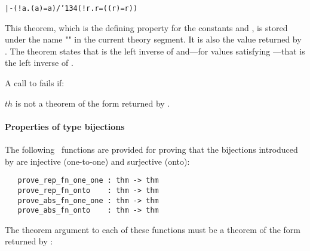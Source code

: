 {\def\bk{\char'134}
\begin{hol}\begin{alltt}
   |- (!a. ( a) = a) /\bk (!r.  r = (( r) = r))
\end{alltt}\end{hol}}

\noindent This theorem, which is the defining property for the constants
 and , is stored under the name "" in the current theory
segment.  It is also the value returned by .
The theorem states that  is the left inverse of  and---for
values satisfying ---that  is the left inverse of .

A call to
fails if:

\begin{myenumerate}
\item $th$ is not a theorem of the form returned by
.
\end{myenumerate}%

\paragraph{Properties of type bijections}


The following \ML\ functions are provided for proving that the bijections
introduced by  are injective (one-to-one)
and surjective (onto):

\begin{boxed}
\begin{verbatim}
   prove_rep_fn_one_one : thm -> thm
   prove_rep_fn_onto    : thm -> thm
   prove_abs_fn_one_one : thm -> thm
   prove_abs_fn_onto    : thm -> thm
\end{verbatim}\end{boxed}

\noindent The theorem argument to each of these functions must be a theorem
of the form returned by :

